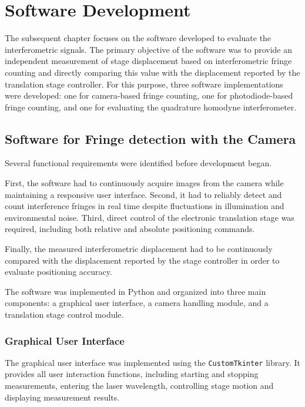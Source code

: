 \chapter{Software Development}
\label{chap:software_analysis}
\thispagestyle{empty}

The subsequent chapter focuses on the software developed to evaluate the interferometric signals.
The primary objective of the software was to provide an independent measurement of stage displacement based on interferometric fringe counting and directly comparing this value with the displacement reported by the translation stage controller. For this purpose, three software implementations were developed: one for camera-based fringe counting, one for photodiode-based fringe counting, and one for evaluating the quadrature homodyne interferometer.

\section{Software for Fringe detection with the Camera}
Several functional requirements were identified before development began.

First, the software had to continuously acquire images from the camera while maintaining a responsive user interface. Second, it had to reliably detect and count interference fringes in real time despite fluctuations in illumination and environmental noise. Third, direct control of the electronic translation stage was required, including both relative and absolute positioning commands.

Finally, the measured interferometric displacement had to be continuously compared with the displacement reported by the stage controller in order to evaluate positioning accuracy.

The software was implemented in Python and organized into three main components: a graphical user interface, a camera handling module, and a translation stage control module.

\subsection{Graphical User Interface}

The graphical user interface was implemented using the \texttt{CustomTkinter} library. It provides all user interaction functions, including starting and stopping measurements, entering the laser wavelength, controlling stage motion and displaying measurement results.

